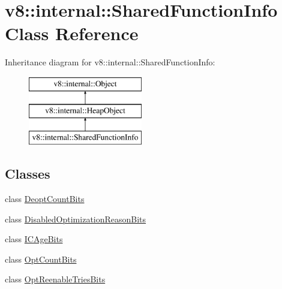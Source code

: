 \hypertarget{classv8_1_1internal_1_1_shared_function_info}{}\section{v8\+:\+:internal\+:\+:Shared\+Function\+Info Class Reference}
\label{classv8_1_1internal_1_1_shared_function_info}
Inheritance diagram for v8\+:\+:internal\+:\+:Shared\+Function\+Info\+:\begin{figure}[H]
\begin{center}
\leavevmode
\includegraphics[height=3.000000cm]{classv8_1_1internal_1_1_shared_function_info}
\end{center}
\end{figure}
\subsection*{Classes}
\begin{DoxyCompactItemize}
\item 
class \hyperlink{classv8_1_1internal_1_1_shared_function_info_1_1_deopt_count_bits}{Deopt\+Count\+Bits}
\item 
class \hyperlink{classv8_1_1internal_1_1_shared_function_info_1_1_disabled_optimization_reason_bits}{Disabled\+Optimization\+Reason\+Bits}
\item 
class \hyperlink{classv8_1_1internal_1_1_shared_function_info_1_1_i_c_age_bits}{I\+C\+Age\+Bits}
\item 
class \hyperlink{classv8_1_1internal_1_1_shared_function_info_1_1_opt_count_bits}{Opt\+Count\+Bits}
\item 
class \hyperlink{classv8_1_1internal_1_1_shared_function_info_1_1_opt_reenable_tries_bits}{Opt\+Reenable\+Tries\+Bits}
\end{DoxyCompactItemize}
